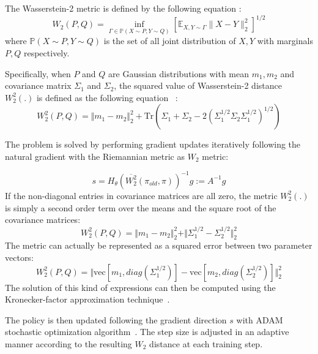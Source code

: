 The Wasserstein-2 metric is defined by the following equation \cite{villani2003topics}:
\begin{equation}
    W_2(P,Q) = 
    \inf_{\Gamma \in \mathbb{P}(X \sim P, Y \sim Q)}
   \left[  \mathbb{E}_{X,Y \sim \Gamma} \lVert X-Y \rVert_2^2 \right]^{1/2}
\end{equation}
where $\mathbb{P}(X \sim P, Y \sim Q)$ is the set of all joint distribution of $X,Y$ with marginals $P,Q$ respectively.

Specifically, when $P$ and $Q$ are Gaussian distributions with mean $m_1,m_2$ and covariance matrix $\Sigma_1$ and $\Sigma_2$, the squared value of Wasserstein-2 distance $W_2^2(.)$ is defined as the following equation~\cite{chafai} :
\begin{equation}
    W_2^2(P,Q) = \Vert m_1-m_2\Vert_2^2 +\mathrm{Tr}\left(\Sigma_1+\Sigma_2-2(\Sigma_1^{1/2}\Sigma_2\Sigma_1^{1/2})^{1/2}\right)
\end{equation}

The problem is solved by performing gradient updates iteratively following the natural gradient with the Riemannian metric as $W_2$ metric:

\begin{equation}
    s=H_\theta\left( \overline{W_2^2}(\pi_{old},\pi) \right)^{-1}g := A^{-1}g
\end{equation}
%
%
If the non-diagonal entries in covariance matrices are all zero, the metric $W_2^2(.)$ is simply a second order term over the means and the square root of the covariance matrices:
\begin{equation}
W_2^2(P,Q) = \Vert m_1-m_2\Vert_2^2 +\Vert \Sigma_1^{1/2}-\Sigma_2^{1/2}\Vert_2^2
\end{equation}
The metric can actually be represented as a squared error between two parameter vectors:
\begin{equation}
W_2^2(P,Q) = \Vert \text{vec}[m_1,diag(\Sigma_1^{1/2})]-\text{vec}[m_2,diag(\Sigma_2^{1/2})]\Vert_2^2 
\end{equation}
The solution of this kind of expressions can then be computed using the Kronecker-factor approximation technique~\cite{wu2017scalable}.

The policy is then updated following the gradient direction $s$ with ADAM stochastic optimization algorithm~\cite{kingma2014adam}. The step size is adjusted in an adaptive manner according to the resulting $W_2$ distance at each training step.